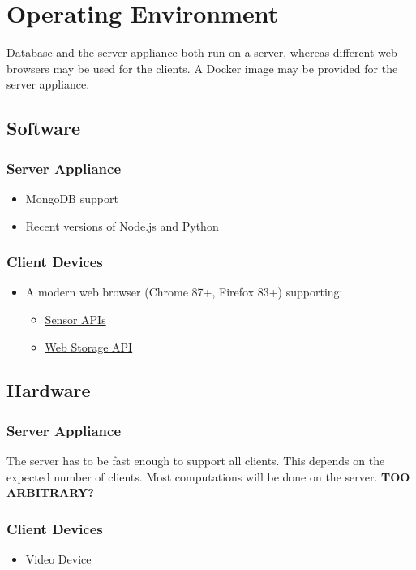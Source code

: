 \section{Operating Environment}
Database and the server appliance both run on a server, whereas different web browsers may be used for the clients. A Docker image may be provided for the server appliance.

\subsection{Software}
\subsubsection{Server Appliance}
\begin{itemize}
    \item MongoDB support
    \item Recent versions of Node.js and Python %
\end{itemize}
\subsubsection{Client Devices}
\begin{itemize}
    \item A modern web browser (Chrome 87+, Firefox 83+) supporting:
    \begin{itemize}
        \item \href{https://developer.mozilla.org/en-US/docs/Web/API/Sensor_APIs}{Sensor APIs}
        \item \href{https://developer.mozilla.org/en-US/docs/Web/API/Web_Storage_API}{Web Storage API}
    \end{itemize}
\end{itemize}

\subsection{Hardware} %
\subsubsection{Server Appliance}
    The server has to be fast enough to support all clients. This depends on the expected number of clients. Most computations will be done on the server. \textbf{TOO ARBITRARY?}
\subsubsection{Client Devices}
\begin{itemize}
    \item Video Device
\end{itemize}
